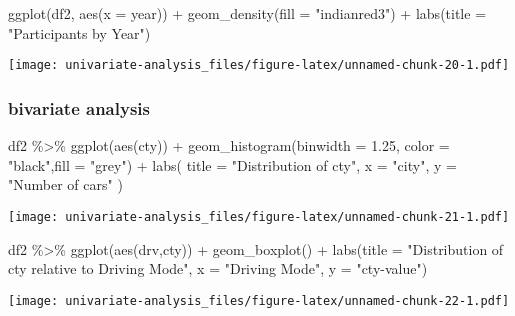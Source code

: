 \documentclass[
]{article}
\newenvironment{Shaded}{\begin{snugshade}}{\end{snugshade}}
\newcommand{\AttributeTok}[1]{\textcolor[rgb]{0.77,0.63,0.00}{#1}}
\newcommand{\FloatTok}[1]{\textcolor[rgb]{0.00,0.00,0.81}{#1}}
\newcommand{\FunctionTok}[1]{\textcolor[rgb]{0.00,0.00,0.00}{#1}}
\newcommand{\NormalTok}[1]{#1}
\newcommand{\SpecialCharTok}[1]{\textcolor[rgb]{0.00,0.00,0.00}{#1}}
\newcommand{\StringTok}[1]{\textcolor[rgb]{0.31,0.60,0.02}{#1}}
\begin{document}
\begin{Shaded}
\begin{Highlighting}[]
\FunctionTok{ggplot}\NormalTok{(df2, }\FunctionTok{aes}\NormalTok{(}\AttributeTok{x =}\NormalTok{ year)) }\SpecialCharTok{+}
       \FunctionTok{geom\_density}\NormalTok{(}\AttributeTok{fill =} \StringTok{"indianred3"}\NormalTok{) }\SpecialCharTok{+} 
       \FunctionTok{labs}\NormalTok{(}\AttributeTok{title =} \StringTok{"Participants by Year"}\NormalTok{)}
\end{Highlighting}
\end{Shaded}

\texttt{[image: univariate-analysis\_files/figure-latex/unnamed-chunk-20-1.pdf]}

\hypertarget{bivariate-analysis}{%
\subsubsection{bivariate analysis}\label{bivariate-analysis}}

\begin{Shaded}
\begin{Highlighting}[]
\NormalTok{df2 }\SpecialCharTok{\%\textgreater{}\%}
    \FunctionTok{ggplot}\NormalTok{(}\FunctionTok{aes}\NormalTok{(cty)) }\SpecialCharTok{+}
    \FunctionTok{geom\_histogram}\NormalTok{(}\AttributeTok{binwidth =} \FloatTok{1.25}\NormalTok{, }\AttributeTok{color =} \StringTok{"black"}\NormalTok{,}\AttributeTok{fill =} \StringTok{"grey"}\NormalTok{) }\SpecialCharTok{+}
    \FunctionTok{labs}\NormalTok{(}
        \AttributeTok{title =} \StringTok{"Distribution of cty"}\NormalTok{,}
         \AttributeTok{x =} \StringTok{"city"}\NormalTok{,}
         \AttributeTok{y =} \StringTok{"Number of cars"}
\NormalTok{    ) }
\end{Highlighting}
\end{Shaded}

\texttt{[image: univariate-analysis\_files/figure-latex/unnamed-chunk-21-1.pdf]}

\begin{Shaded}
\begin{Highlighting}[]
\NormalTok{df2 }\SpecialCharTok{\%\textgreater{}\%}
    \FunctionTok{ggplot}\NormalTok{(}\FunctionTok{aes}\NormalTok{(drv,cty)) }\SpecialCharTok{+}
    \FunctionTok{geom\_boxplot}\NormalTok{() }\SpecialCharTok{+}
    \FunctionTok{labs}\NormalTok{(}\AttributeTok{title =} \StringTok{"Distribution of cty relative to Driving Mode"}\NormalTok{,}
         \AttributeTok{x =} \StringTok{"Driving Mode"}\NormalTok{,}
         \AttributeTok{y =} \StringTok{"cty{-}value"}\NormalTok{)}
\end{Highlighting}
\end{Shaded}

\texttt{[image: univariate-analysis\_files/figure-latex/unnamed-chunk-22-1.pdf]}
\end{document}
